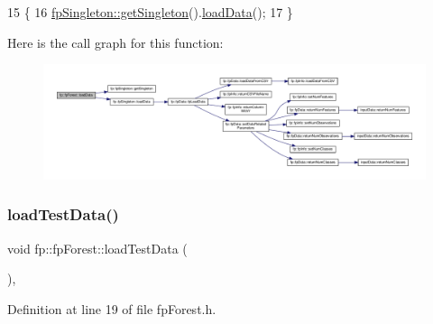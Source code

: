 \begin{DoxyCode}
15                            \{
16                 \hyperlink{classfp_1_1fpSingleton_a8bdae77b68521003e3fc630edec2e240}{fpSingleton::getSingleton}().\hyperlink{classfp_1_1fpSingleton_a86042ae6be6f59dfb90232678350011a}{loadData}();
17             \}
\end{DoxyCode}
Here is the call graph for this function\+:\nopagebreak
\begin{figure}[H]
\begin{center}
\leavevmode
\includegraphics[width=350pt]{classfp_1_1fpForest_a01631065f4909f10cea4b690084a345a_cgraph}
\end{center}
\end{figure}
\mbox{\label{classfp_1_1fpForest_abdcf008b65b6af7be5428d838b33be32}} 
\subsubsection{\texorpdfstring{load\+Test\+Data()}{loadTestData()}}
{\footnotesize\ttfamily void fp\+::fp\+Forest\+::load\+Test\+Data (\begin{DoxyParamCaption}{ }\end{DoxyParamCaption})\hspace{0.3cm}{\ttfamily [inline]}, {\ttfamily [protected]}}



Definition at line 19 of file fp\+Forest.\+h.


